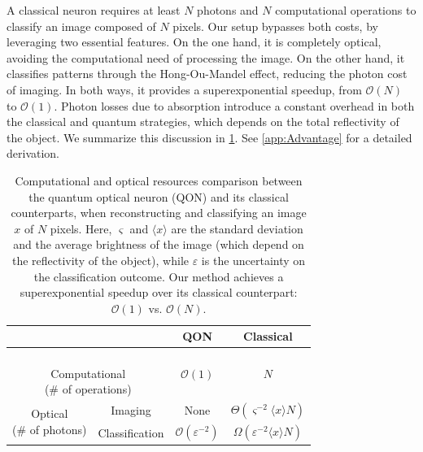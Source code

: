 \documentclass[reprint,
superscriptaddress,
nofootinbib,
aps,
pra,
showkeys
]{revtex4-2}
\begin{document}
A classical neuron requires at least $N$ photons and $N$ computational operations to classify an image composed of $N$ pixels. Our setup bypasses both costs, by leveraging two essential features. On the one hand, it is completely optical, avoiding the computational need of processing the image. On the other hand, it classifies patterns through the Hong-Ou-Mandel effect, reducing the photon cost of imaging. In both ways, it provides a superexponential speedup, from $\mathcal{O}(N)$ to $\mathcal{O}(1)$. Photon losses due to absorption introduce a constant overhead in both the classical and quantum strategies, which depends on the total reflectivity of the object. We summarize this discussion in \cref{tab:ResourceCost}. See \cref{app:Advantage} for a detailed derivation.
\begin{table}[H]
	\centering
	\def\arraystretch{1.5}
	\setlength\tabcolsep{5pt}
	\begin{tabular}{|c|c|c|c|}
		\cline{3-4}
		\multicolumn{1}{c}{} & \multicolumn{1}{c|}{} & \multicolumn{1}{c|}{QON} & Classical \\ \hline
		\multicolumn{2}{|c|}{\parbox{3cm}{\centering \ \\[0.5pt] Computational \\ (\# of operations) \\[3pt]}} & $\mathcal{O}(1)$ & $N$ \\ \hline %
 		\multirow{2}{*}{\parbox{2.25cm}{\centering Optical \\ (\# of photons)}} & Imaging & None & $\Theta(\varsigma^{-2}\langle x \rangle N)$ \\ \cline{2-4}
 		& Classification & $\mathcal{O}(\varepsilon^{-2})$ & $\Omega\left(\varepsilon^{-2}\langle x \rangle N\right)$ \\ \hline
	\end{tabular}
	\caption{\label{tab:ResourceCost}Computational and optical resources comparison between the quantum optical neuron (QON) and its classical counterparts, when reconstructing and classifying an image $x$ of $N$ pixels. Here, $\varsigma$ and $\langle x \rangle $ are the standard deviation and the average brightness of the image (which depend on the reflectivity of the object), while $\varepsilon$ is the uncertainty on the classification outcome. Our method achieves a superexponential speedup over its classical counterpart: $\mathcal{O}(1)$ vs. $\mathcal{O}(N)$.}
\end{table}
\end{document}

